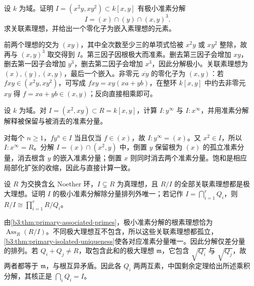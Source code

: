 \begin{exercise}\label{b3:ex:04-three-components}
	设 \(k\) 为域。证明 \(I=(x^2y,xy^2)\subset k[x,y]\) 有极小准素分解
	\[
		I=(x)\cap(y)\cap(x,y)^3.
	\]
	求关联素理想，并给出一个零化子为嵌入素理想的元素。
\end{exercise}
\begin{solution}
	前两个理想的交为 \((xy)\)，其中全次数至少三的单项式恰被 \(x^2y\) 或 \(xy^2\) 整除，故再与 \((x,y)^3\) 取交得到 \(I\)。第三因子因根极大而准素。删去第三因子会增加 \(xy\)，删去第一因子会增加 \(y^3\)，删去第二因子会增加 \(x^3\)，因此分解极小。关联素理想为 \((x),(y),(x,y)\)，最后一个嵌入。非零元 \(\overline{xy}\) 的零化子为 \((x,y)\)：若 \(fxy\in(x^2y,xy^2)\)，可写成 \(fxy=xy(xa+yb)\)，在整环 \(k[x,y]\) 中约去非零元 \(xy\) 得 \(f=xa+yb\in(x,y)\)；反向直接相乘即可。
\end{solution}

\begin{exercise}\label{b3:ex:04-saturation-components}
	设 \(k\) 为域。对 \(I=(x^2,xy)\subset R=k[x,y]\)，计算 \(I:y^\infty\) 与 \(I:x^\infty\)，并用准素分解解释被保留与被消去的准素分量。
\end{exercise}
\begin{solution}
	对每个 \(n\ge1\)，\(fy^n\in I\) 当且仅当 \(f\in(x)\)，故 \(I:y^\infty=(x)\)。又 \(x^2\in I\)，所以 \(I:x^\infty=R\)。分解 \(I=(x)\cap(x^2,y)\) 中，倒置 \(y\) 保留根为 \((x)\) 的孤立准素分量，消去根含 \(y\) 的嵌入准素分量；倒置 \(x\) 则同时消去两个准素分量。饱和是相应局部化扩张的收缩，因此与直接计算一致。
\end{solution}

\begin{exercise}\label{b3:ex:04-maximal-components-crt}
	设 \(R\) 为交换含幺 Noether 环，\(I\subsetneq R\) 为真理想，且 \(R/I\) 的全部关联素理想都是极大理想。证明 \(I\) 的极小准素分解除分量排列外唯一；若记作 \(I=\bigcap_{i=1}^r Q_i\)，则 \(R/I\cong\prod_{i=1}^rR/Q_i\)。
\end{exercise}
\begin{solution}
	由\cref{b3:thm:primary-associated-primes}，极小准素分解的根素理想恰为 \(\operatorname{Ass}_R(R/I)\)。不同极大理想互不包含，所以这些关联素理想都孤立，\cref{b3:thm:primary-isolated-uniqueness}使各对应准素分量唯一。因此分解仅差分量的排列。若 \(Q_i+Q_j\ne R\)，取包含此和的极大理想 \(\mathfrak m\)，它包含 \(\sqrt{Q_i}\) 与 \(\sqrt{Q_j}\)，故两者都等于 \(\mathfrak m\)，与根互异矛盾。因此各 \(Q_i\) 两两互素，中国剩余定理给出所述乘积分解，其核正是 \(\bigcap_iQ_i=I\)。
\end{solution}

